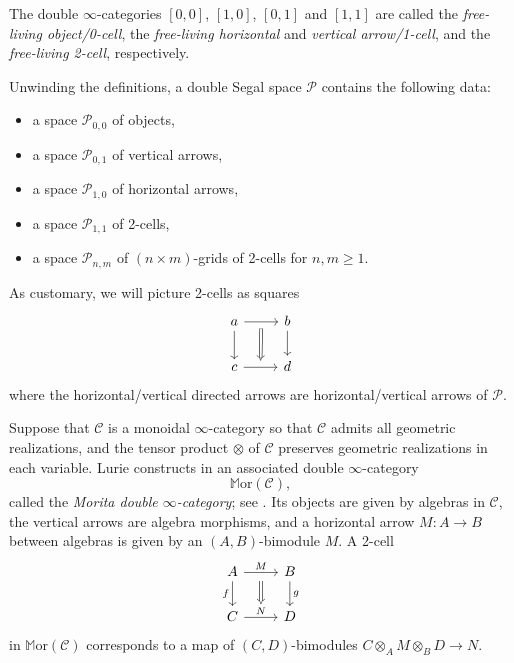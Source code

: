 \documentclass[a4paper, 11pt]{amsart}
\numberwithin{theorem}{section}
\theoremstyle{definition}
\newcommand{\C}{\mathscr{C}}
\renewcommand{\P}{\mathscr{P}}
\begin{document}
	The double $\infty$-categories $[0,0]$, $[1,0]$, $[0,1]$ and $[1,1]$ are called the \textit{free-living object/0-cell}, the \textit{free-living horizontal} and \textit{vertical arrow/1-cell}, and the \textit{free-living 2-cell}, 
	respectively.

\begin{remark}
Unwinding the definitions, a double Segal space $\P$ contains the following data: 
\begin{itemize} 
\item a space $\P_{0,0}$ of objects,
\item a space $\P_{0,1}$ of {vertical arrows},
\item a space $\P_{1,0}$ of {horizontal arrows},
\item a space $\P_{1,1}$ of 
2-cells,
\item a space $\P_{n,m}$ of $(n \times m)$-grids of 2-cells for $n,m \geq 1$.
\end{itemize}
As customary, we will picture 2-cells as squares
\[
	\begin{tikzcd}
		a \arrow[r, ""'name=f]\arrow[d] & b \arrow[d] \\
		c \arrow[r, ""name=t] & d
		\arrow[from=f, to=t, Rightarrow]
	\end{tikzcd}
\]
where the horizontal/vertical directed arrows are horizontal/vertical arrows of $\P$. 
\end{remark}


\begin{example}\label{example.dbl-cat-morita}
	Suppose that $\C$ is a monoidal $\infty$-category so that $\C$ admits all geometric realizations, 
	and the tensor product $\otimes$ of $\C$ preserves geometric realizations in each variable.
 	Lurie constructs in \cite[Subsection 4.4.3]{HA} an associated double $\infty$-category
	$$
	\mathbb{M}\mathrm{or}(\C),
	$$
	called the \textit{Morita double $\infty$-category}; see \cite[Remark 4.4.3.11]{HA}. Its objects are given by algebras in $\C$, the vertical arrows 
	are algebra morphisms, and a horizontal arrow $M:A \rightarrow B$ between algebras is given by an $(A,B)$-bimodule $M$. 
	A 2-cell 
	\[
	\begin{tikzcd}
		A \arrow[r ,"M"name=f] \arrow[d,"f"'] & B \arrow[d, "g"] \\
		C \arrow[r,"N"name=t] & D
		\arrow[from=f, to=t, Rightarrow, shorten <= 6pt]
	\end{tikzcd}
	\]
	in $\mathbb{M}\mathrm{or}(\C)$  
	corresponds to a map of $(C,D)$-bimodules $C \otimes_A M \otimes_B D \rightarrow N$.
\end{example}
\end{document}
